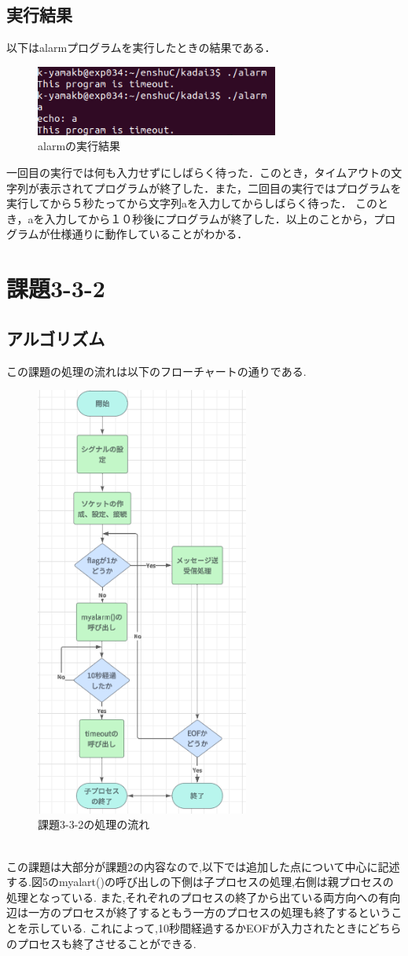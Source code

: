 \documentclass[dvipdfmx]{jarticle}
\begin{document}
\subsection{実行結果}
以下はalarmプログラムを実行したときの結果である．
\begin{figure}[h]
    \centering
    \includegraphics[width=8cm]{result3-3-1.png}
    \caption{alarmの実行結果}
\end{figure}
一回目の実行では何も入力せずにしばらく待った．このとき，タイムアウトの文字列が表示されてプログラムが終了した．また，二回目の実行ではプログラムを実行してから５秒たってから文字列aを入力してからしばらく待った．
このとき，aを入力してから１０秒後にプログラムが終了した．以上のことから，プログラムが仕様通りに動作していることがわかる．
\section{課題3-3-2}
\subsection{アルゴリズム}
この課題の処理の流れは以下のフローチャートの通りである.
\begin{figure}[h]
    \centering
    \includegraphics[width=7cm]{3-3-2.png}
    \caption{課題3-3-2の処理の流れ}
\end{figure}
\\この課題は大部分が課題2の内容なので,以下では追加した点について中心に記述する.図5のmyalart()の呼び出しの下側は子プロセスの処理,右側は親プロセスの処理となっている.
また,それぞれのプロセスの終了から出ている両方向への有向辺は一方のプロセスが終了するともう一方のプロセスの処理も終了するということを示している.
これによって,10秒間経過するかEOFが入力されたときにどちらのプロセスも終了させることができる.
\end{document}

